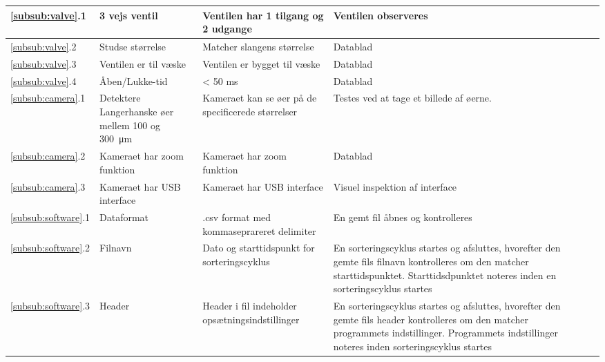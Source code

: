 \begin{center}
\begin{longtable}{ | m{1.785cm} | m{1.785cm}| m{1.785cm}| m{1.785cm}| m{1.785cm}| m{1.785cm}|m{1.785cm}| }
\ref{subsub:valve}.1 
			& 
3 vejs ventil
   & 
Ventilen har 1 tilgang og 2 udgange
    &
     Ventilen observeres
    &  & & \\
			\hline
			
			\ref{subsub:valve}.2 
			& 
Studse størrelse
   & 
Matcher slangens størrelse
    &
     Datablad
    &  & & \\
			\hline
		
				\ref{subsub:valve}.3
			& 
Ventilen er til væske
   & 
Ventilen er bygget til væske
    &
     Datablad
    &  & & \\
			\hline	
			
						\ref{subsub:valve}.4
			& 
Åben/Lukke-tid
   & 
< 50 ms
    &
     Datablad
    &  & & \\
			\hline	
			
			\hline	
			
						\ref{subsub:camera}.1
			& 
Detektere Langerhanske øer mellem 100 og  \SI{300}{\micro\metre}  \
   & 
Kameraet kan se øer på de specificerede størrelser
    &
     Testes ved at tage et billede af øerne. 
    &  & & \\
			\hline	
			
			\hline	
			
						\ref{subsub:camera}.2
			& 
Kameraet har zoom funktion \
   & 
Kameraet har zoom funktion
    &
     Datablad 
    &  & & \\
			\hline	
			
			\hline	
			
						\ref{subsub:camera}.3
			& 
Kameraet har USB interface \
   & 
Kameraet har USB interface
    &
     Visuel inspektion af interface 
    &  & & \\
			\hline	
			
			\hline	
			
						\ref{subsub:software}.1
			& 
Dataformat \
   & 
.csv format med kommaseprareret delimiter
    &
     En gemt fil åbnes og kontrolleres
    &  & & \\
			\hline
			
			
			
						\ref{subsub:software}.2
			& 
Filnavn \
   & 
Dato og starttidspunkt for sorteringscyklus
    &
     En sorteringscyklus startes og afsluttes, hvorefter den gemte fils filnavn kontrolleres om den matcher starttidspunktet. Starttidsdpunktet noteres inden en sorteringscyklus startes
    &  & & \\
				
				
				\hline	
			
						\ref{subsub:software}.3
			& 
Header \
   & 
Header i fil indeholder opsætningsindstillinger
    &
     En sorteringscyklus startes og afsluttes, hvorefter den gemte fils header kontrolleres om den matcher programmets indstillinger. Programmets indstillinger noteres inden sorteringscyklus startes
    &  & & \\
			\hline	
			

\end{longtable}
\end{center}
